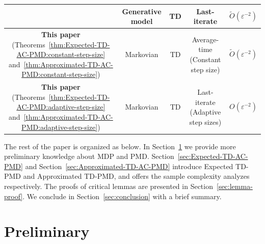 \documentclass[10pt]{article}
\theoremstyle{plain}
\theoremstyle{definition}
\begin{document}
\begin{table}[ht!]
\begin{tabular}{ccccc}
    \citet{liu2025tdpmd} & Generative model & TD  & Last-iterate & $\tilde O(\varepsilon^{-2})$ \\ \hline
    \makecell*[cc]{\textbf{This paper} \\ (Theorems~\ref{thm:Expected-TD-AC-PMD:constant-step-size} and~\ref{thm:Approximated-TD-AC-PMD:constant-step-size})} & Markovian & TD & \makecell[cc]{Average-time \\ (Constant step size)} & $\tilde O (\varepsilon^{-2})$ \\ \hline 
    \makecell*[cc]{\textbf{This paper} \\ (Theorems~\ref{thm:Expected-TD-AC-PMD:adaptive-step-size} and~\ref{thm:Approximated-TD-AC-PMD:adaptive-step-size})} & Markovian & TD & \makecell[cc]{Last-iterate \\ (Adaptive step sizes)} & $O (\varepsilon^{-2})$ \\
    \bottomrule
    \end{tabular}
\end{table}

The rest of the paper is organized as below. In Section~\ref{sec:preliminary} we provide more preliminary knowledge about MDP and PMD. Section~\ref{sec:Expected-TD-AC-PMD} and Section~\ref{sec:Approximated-TD-AC-PMD} introduce Expected TD-PMD and Approximated TD-PMD, and offers the sample complexity analyzes respectively. {The proofs of critical lemmas are presented in Section~\ref{sec:lemma-proof}.} We conclude in Section~\ref{sec:conclusion} with a brief summary.

\section{Preliminary}
\label{sec:preliminary}
\end{document}
